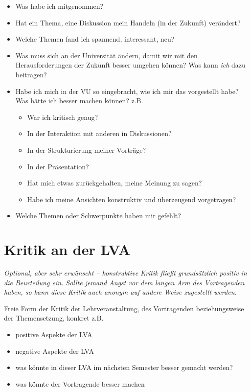 \documentclass[twoside, a4paper, DIV=11, open=any, bibliography=totoc]{scrbook}
\begin{document}
\begin{itemize}
    \item Was habe ich mitgenommen?
    \item Hat ein Thema, eine Diskussion mein Handeln (in der Zukunft) verändert?
    \item Welche Themen fand ich spannend, interessant, neu?
    \item Was muss sich an der Universität ändern, damit wir mit den Herausforderungen der Zukunft besser umgehen können? Was kann \textit{ich} dazu beitragen?
    \item Habe ich mich in der VU so eingebracht, wie ich mir das vorgestellt habe? Was hätte ich besser machen können? z.B.
    \begin{itemize}
        \item War ich kritisch genug?
        \item In der Interaktion mit anderen in Diskussionen?
        \item In der Strukturierung meiner Vorträge?
        \item In der Präsentation?
        \item Hat mich etwas zurückgehalten, meine Meinung zu sagen?
        \item Habe ich meine Ansichten konstruktiv und überzeugend vorgetragen?
    \end{itemize}
    \item Welche Themen oder Schwerpunkte haben mir gefehlt?
\end{itemize}


\section{Kritik an der LVA} \label{sec:}
\textit{Optional, aber sehr erwünscht -- konstruktive Kritik fließt grundsätzlich positiv in die Beurteilung ein. Sollte jemand Angst vor dem langen Arm des Vortragenden haben, so kann diese Kritik auch anonym auf andere Weise zugestellt werden.}

Freie Form der Kritik der Lehrveranstaltung, des Vortragenden beziehungsweise der Themensetzung, konkret z.B.

\begin{itemize}
    \item positive Aspekte der LVA
    \item negative Aspekte der LVA
    \item was könnte in dieser LVA im nächsten Semester besser gemacht werden?
    \item was könnte der Vortragende besser machen
\end{itemize}
\end{document}
